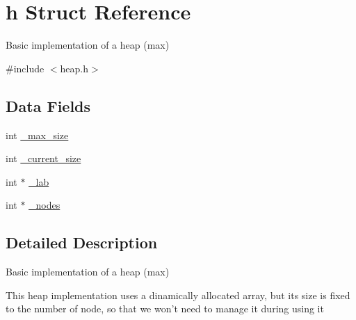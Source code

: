 \hypertarget{structh}{\section{h Struct Reference}
\label{structh}
}


Basic implementation of a heap (max)  




{\ttfamily \#include $<$heap.\-h$>$}

\subsection*{Data Fields}
\begin{DoxyCompactItemize}
\item 
int \hyperlink{structh_a3d03059f0a1bc2073f03e63e081f5569}{\-\_\-max\-\_\-size}
\item 
int \hyperlink{structh_a2b3ba20b57b525879ffd03f99a3ba916}{\-\_\-current\-\_\-size}
\item 
int $\ast$ \hyperlink{structh_a3d4aadf6e58d62691fef211a1d405507}{\-\_\-lab}
\item 
int $\ast$ \hyperlink{structh_a97261eb8fa5f089f81128157bee1ed71}{\-\_\-nodes}
\end{DoxyCompactItemize}


\subsection{Detailed Description}
Basic implementation of a heap (max) 

This heap implementation uses a dinamically allocated array, but its size is fixed to the number of node, so that we won't need to manage it during using it 

